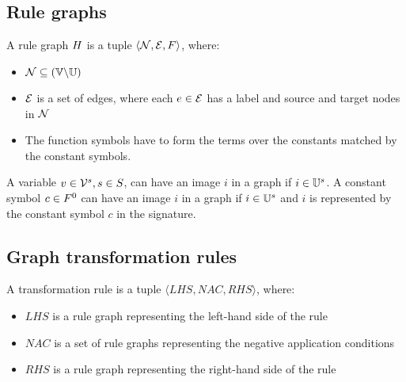 \subsection{Rule graphs}
A rule graph $H$ is a tuple $\langle \mathcal{N}, \mathcal{E}, F \rangle$, where:
\begin{itemize}
  \item $\mathcal{N} \subseteq (\mathbb{V} \backslash \mathbb{U})$
  \item $\mathcal{E}$ is a set of edges, where each $e \in \mathcal{E}$ has a label and source and target nodes in $\mathcal{N}$
  \item The function symbols have to form the terms over the constants matched by the constant symbols.
\end{itemize}

A variable $v \in \mathcal{V}^{s}, s \in S$, can have an image $i$ in a graph if $i \in \mathbb{U}^{s}$. A constant symbol $c \in F^0$ can have an image $i$ in a graph if $i \in \mathbb{U}^{s}$ and $i$ is represented by the constant symbol $c$ in the signature.

\subsection{Graph transformation rules}\label{sec:graph_rules}
\vspace{5px}
\begin{definition}
A transformation rule is a tuple $\langle \mathit{LHS}, \mathit{NAC}, \mathit{RHS}\rangle$, where:
\begin{itemize}
  \item $\mathit{LHS}$ is a rule graph representing the left-hand side of the rule
  \item $\mathit{NAC}$ is a set of rule graphs representing the negative application conditions
  \item $\mathit{RHS}$ is a rule graph representing the right-hand side of the rule
\end{itemize}
\end{definition}

\begin{comment}\begin{definition}
$\mathit{LHS}$ is a tuple $\langle \mathcal{V}_{LHS}, \mathcal{E}_{LHS}, \mathcal{O}_{LHS} \rangle$, where $\mathcal{O}_{LHS} \subseteq \mathcal{V}^n \times O_p \times \mathcal{V}$.
\end{definition}\end{comment}

